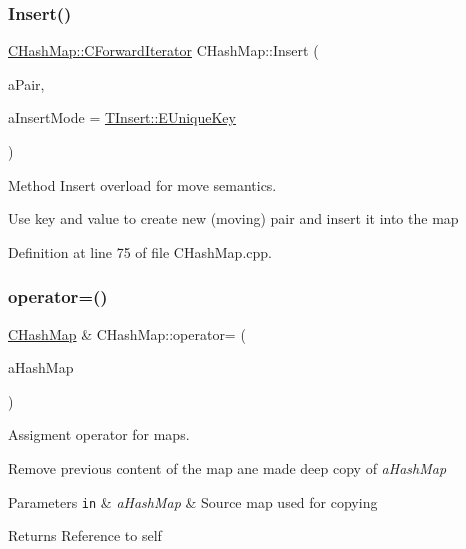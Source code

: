 \subsubsection{\texorpdfstring{Insert()}{Insert()}\hspace{0.1cm}{\footnotesize\ttfamily [2/2]}}
{\footnotesize\ttfamily \hyperlink{class_c_hash_map_1_1_c_forward_iterator}{C\+Hash\+Map\+::\+C\+Forward\+Iterator} C\+Hash\+Map\+::\+Insert (\begin{DoxyParamCaption}\item[{\hyperlink{class_c_pair}{C\+Pair} \&\&}]{a\+Pair,  }\item[{\hyperlink{class_c_hash_map_ad4dd353df970a4464c449ef9f3b6a172}{T\+Insert}}]{a\+Insert\+Mode = {\ttfamily \hyperlink{class_c_hash_map_ad4dd353df970a4464c449ef9f3b6a172a9823330641aba5e354b5ec054e03925d}{T\+Insert\+::\+E\+Unique\+Key}} }\end{DoxyParamCaption})}



Method Insert overload for move semantics. 

Use key and value to create new (moving) pair and insert it into the map 

Definition at line 75 of file C\+Hash\+Map.\+cpp.

\mbox{\label{class_c_hash_map_ac7b55d10283947ce6c4f0a7e73a0f80f}} 
\subsubsection{\texorpdfstring{operator=()}{operator=()}\hspace{0.1cm}{\footnotesize\ttfamily [1/2]}}
{\footnotesize\ttfamily \hyperlink{class_c_hash_map}{C\+Hash\+Map} \& C\+Hash\+Map\+::operator= (\begin{DoxyParamCaption}\item[{const \hyperlink{class_c_hash_map}{C\+Hash\+Map} \&}]{a\+Hash\+Map }\end{DoxyParamCaption})}



Assigment operator for maps. 

Remove previous content of the map ane made deep copy of {\itshape a\+Hash\+Map} 
\begin{DoxyParams}[1]{Parameters}
\mbox{\tt in}  & {\em a\+Hash\+Map} & Source map used for copying \\
\hline
\end{DoxyParams}
\begin{DoxyReturn}{Returns}
Reference to self 
\end{DoxyReturn}


